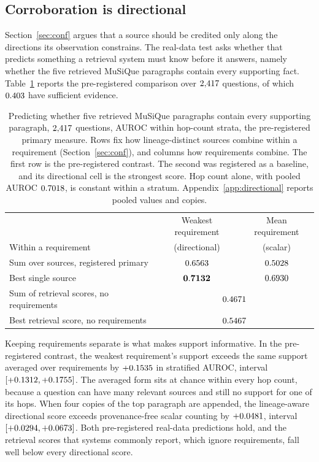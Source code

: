 \documentclass{article}
\begin{document}
\subsection{Corroboration is directional}
\label{sec:directional}

Section~\ref{sec:conf} argues that a source should be credited only along the
directions its observation constrains. The real-data test asks whether that
predicts something a retrieval system must know before it answers, namely
whether the five retrieved MuSiQue paragraphs contain every supporting fact.
Table~\ref{tab:directional} reports the pre-registered comparison over
$2{,}417$ questions, of which $0.403$ have sufficient evidence.

\begin{table}[t]
\centering\small
\caption{Predicting whether five retrieved MuSiQue paragraphs contain every
supporting paragraph, $2{,}417$ questions, AUROC within hop-count strata, the
pre-registered primary measure. Rows fix how lineage-distinct sources combine
within a requirement (Section~\ref{sec:conf}), and columns how requirements
combine. The first row is the pre-registered contrast. The second was
registered as a baseline, and its directional cell is the strongest score. Hop
count alone, with pooled AUROC $0.7018$, is constant within a
stratum. Appendix~\ref{app:directional} reports pooled values and copies.}
\label{tab:directional}
\begin{tabular}{lcc}
\toprule
& Weakest requirement & Mean requirement \\
Within a requirement & (directional) & (scalar) \\
\midrule
Sum over sources, registered primary & $0.6563$ & $0.5028$ \\
Best single source & $\mathbf{0.7132}$ & $0.6930$ \\
\midrule
Sum of retrieval scores, no requirements & \multicolumn{2}{c}{$0.4671$} \\
Best retrieval score, no requirements & \multicolumn{2}{c}{$0.5467$} \\
\bottomrule
\end{tabular}
\end{table}

Keeping requirements separate is what makes support informative. In the
pre-registered contrast, the weakest requirement's support exceeds the same
support averaged over requirements by $+0.1535$ in stratified AUROC,
interval $[+0.1312, +0.1755]$. The averaged form sits at chance within every hop
count, because a question can have many relevant sources and still no support
for one of its hops. When four copies of the top paragraph are appended, the
lineage-aware directional score exceeds provenance-free scalar counting by
$+0.0481$, interval $[+0.0294, +0.0673]$. Both pre-registered real-data predictions
hold, and the retrieval scores that systems commonly report, which ignore
requirements, fall well below every directional score.
\end{document}
